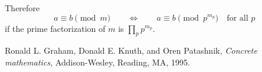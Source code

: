 \documentclass{article}
\begin{document}
Therefore
\begin{equation*}
a\equiv b\pmod{m}
\qquad\Longleftrightarrow\qquad
a\equiv b \pmod{p^{m_p}}\quad\text{for all $p$}  
\end{equation*}
if the prime factorization of $m$ is $\prod_p p^{m_p}$.

\begin{thebibliography}{9}
Ronald L. Graham, Donald E. Knuth, and Oren Patashnik, 
\textit{Concrete mathematics}, 
Addison-Wesley, Reading, MA, 1995.
\end{thebibliography}
\end{document}
